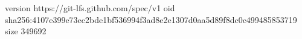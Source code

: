 version https://git-lfs.github.com/spec/v1
oid sha256:4107e399e73ec2bde1bf536994f3ad8e2e1307d0aa5d89f8dc0c499485853719
size 349692
